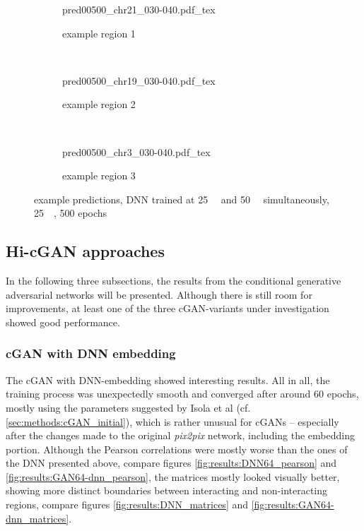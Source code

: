 \begin{figure}[p] %
    \begin{subfigure}{\textwidth}
        \centering
        \scriptsize
        {pred00500_chr21_030-040.pdf_tex}
        \caption{example  region 1} \label{fig:results:25plus50_r1}
    \end{subfigure}\\[6mm]
    \begin{subfigure}{\textwidth}
        \centering
        \scriptsize
        {pred00500_chr19_030-040.pdf_tex}
        \caption{example region 2} \label{fig:results:25plus50_r2}
    \end{subfigure}\\[6mm]
    \begin{subfigure}{\textwidth}
        \centering
        \scriptsize
        {pred00500_chr3_030-040.pdf_tex}
        \caption{example region 3} \label{fig:results:25plus50_r3}
    \end{subfigure}
    \caption{example predictions,  DNN trained at \SI{25}{\kilo\bp} and \SI{50}{\kilo\bp} simultaneously, \SI{25}{\kilo\bp}, 500 epochs}\label{fig:results:25plus50_matrices}
\end{figure}

\clearpage
\subsection{Hi-cGAN approaches} \label{sec:results:cgan}
In the following three subsections, the results from the conditional generative adversarial networks will be presented.
Although there is still room for improvements, at least one of the three cGAN-variants under investigation showed good performance. 

\subsubsection{cGAN with DNN embedding} \label{sec:results:cgan_dnn}
The cGAN with DNN-embedding showed interesting results.
All in all, the training process was unexpectedly smooth and converged after around 60 epochs, mostly using the parameters suggested
by Isola et al \cite{Isola2017} (cf. \ref{sec:methods:cGAN_initial}), which is rather unusual for cGANs -- especially after the changes made to the original
\emph{pix2pix} network, including the embedding portion. 
Although the Pearson correlations were mostly worse than the ones of the DNN presented above, compare figures \ref{fig:results:DNN64_pearson} and \ref{fig:results:GAN64-dnn_pearson},
the matrices mostly looked visually better, showing more distinct boundaries between interacting and non-interacting regions, compare figures \ref{fig:results:DNN_matrices} and \ref{fig:results:GAN64-dnn_matrices}.

